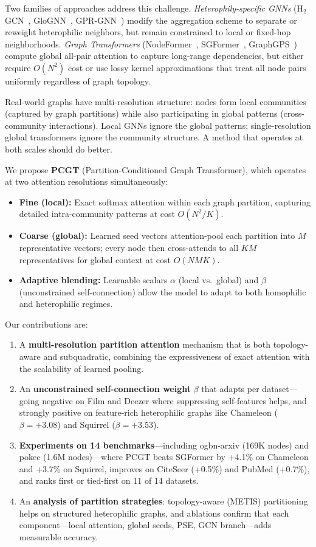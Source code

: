 \documentclass[sigconf]{acmart}
\begin{document}
Two families of approaches address this challenge. \emph{Heterophily-specific GNNs} (H$_2$GCN~\citep{zhu2020h2gcn}, GloGNN~\citep{li2022glognn}, GPR-GNN~\citep{chien2021gprgnn}) modify the aggregation scheme to separate or reweight heterophilic neighbors, but remain constrained to local or fixed-hop neighborhoods. \emph{Graph Transformers} (NodeFormer~\citep{wu2022nodeformer}, SGFormer~\citep{wu2023sgformer}, GraphGPS~\citep{rampasek2022graphgps}) compute global all-pair attention to capture long-range dependencies, but either require $O(N^2)$ cost or use lossy kernel approximations that treat all node pairs uniformly regardless of graph topology.

Real-world graphs have multi-resolution structure: nodes form local communities (captured by graph partitions) while also participating in global patterns (cross-community interactions). Local GNNs ignore the global patterns; single-resolution global transformers ignore the community structure. A method that operates at both scales should do better.

We propose \textbf{PCGT} (Partition-Conditioned Graph Transformer), which operates at two attention resolutions simultaneously:
\begin{itemize}
\item \textbf{Fine (local):} Exact softmax attention within each graph partition, capturing detailed intra-community patterns at cost $O(N^2/K)$.
\item \textbf{Coarse (global):} Learned seed vectors attention-pool each partition into $M$ representative vectors; every node then cross-attends to all $KM$ representatives for global context at cost $O(NMK)$.
\item \textbf{Adaptive blending:} Learnable scalars $\alpha$ (local vs.\ global) and $\beta$ (unconstrained self-connection) allow the model to adapt to both homophilic and heterophilic regimes.
\end{itemize}

Our contributions are:
\begin{enumerate}
\item A \textbf{multi-resolution partition attention} mechanism that is both topology-aware and subquadratic, combining the expressiveness of exact attention with the scalability of learned pooling.
\item An \textbf{unconstrained self-connection weight} $\beta$ that adapts per dataset---going negative on Film and Deezer where suppressing self-features helps, and strongly positive on feature-rich heterophilic graphs like Chameleon ($\beta = +3.08$) and Squirrel ($\beta = +3.53$).
\item \textbf{Experiments on 14 benchmarks}---including ogbn-arxiv (169K nodes) and pokec (1.6M nodes)---where PCGT beats SGFormer by +4.1\% on Chameleon and +3.7\% on Squirrel, improves on CiteSeer (+0.5\%) and PubMed (+0.7\%), and ranks first or tied-first on 11 of 14 datasets.
\item An \textbf{analysis of partition strategies}: topology-aware (METIS) partitioning helps on structured heterophilic graphs, and ablations confirm that each component---local attention, global seeds, PSE, GCN branch---adds measurable accuracy.
\end{enumerate}
\end{document}
